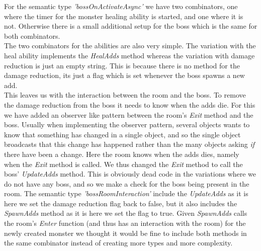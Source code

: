 For the semantic type \textit{'bossOnActivateAsync'} we have two combinators, one where the timer for the monster healing ability is started, and one where it is not. Otherwise there is a small additional setup for the boss which is the same for both combinators.\\
The two combinators for the abilities are also very simple. The variation with the heal ability implements the \textit{HealAdds} method whereas the variation with damage reduction is just an empty string. This is because there is no method for the damage reduction, its just a flag which is set whenever the boss spawns a new add.\\
This leaves us with the interaction between the room and the boss. To remove the damage reduction from the boss it needs to know when the adds die. For this we have added an observer like pattern between the room's \textit{Exit} method and the boss. Usually when implementing the observer pattern, several objects wants to know that something has changed in a single object, and so the single object broadcasts that this change has happened rather than the many objects asking \textit{if} there have been a change. Here the room knows when the adds dies, namely when the \textit{Exit} method is called. We thus changed the \textit{Exit} method to call the boss' \textit{UpdateAdds} method. This is obviously dead code in the variations where we do not have any boss, and so we make a check for the boss being present in the room. The semantic type \textit{'bossRoomInteraction'} include the \textit{UpdateAdds} as it is here we set the damage reduction flag back to false, but it also includes the \textit{SpawnAdds} method as it is here we set the flag to true. Given \textit{SpawnAdds} calls the room's \textit{Enter} function (and thus has an interaction with the room) for the newly created monster we thought it would be fine to include both methods in the same combinator instead of creating more types and more complexity.\\
